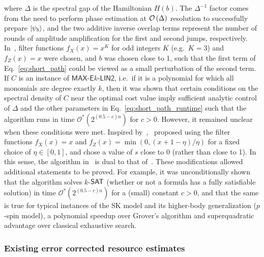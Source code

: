 \begin{refsection}
\begin{itemize}
where $\Delta$ is the spectral gap of the Hamiltonian $H(b)$. The $\Delta^{-1}$ factor comes from the need to perform phase estimation at $\mathcal{O}\left( \Delta \right)$ resolution to successfully prepare $\lvert\psi_b\rangle$, and the two additive inverse overlap terms represent the number of rounds of amplitude amplification for the first and second jumps, respectively. In~\cite{hastings2018ShortPathQuantum}, filter functions $f_X(x) = x^K$ for odd integers $K$ (e.g.~$K=3$) and $f_Z(x) = x$ were chosen, and $b$ was chosen close to 1, such that the first term of Eq.~\eqref{eq:short_path} could be viewed as a small perturbation of the second term. If $C$ is an instance of $\mathsf{MAX}$-$\mathsf{E}k$-$\mathsf{LIN2}$, i.e.~if it is a polynomial for which all monomials are degree exactly $k$, then it was shown that certain conditions on the spectral density of $C$ near the optimal cost value imply sufficient analytic control of $\Delta$ and the other parameters in Eq.~\eqref{eq:short_path_runtime} such that the algorithm runs in time $\mathcal{O}^*(2^{(0.5-c)n})$ for $c  > 0$. However, it remained unclear when these conditions were met. Inspired by~\cite{hastings2018ShortPathQuantum},~\cite{dalzell2022mindthegap} proposed using the filter functions $f_X(x) = x$ and $f_Z(x) = \min(0,(x+1-\eta)/\eta)$ for a fixed choice of $\eta \in [0,1]$, and chose a value of $s$ close to 0 (rather than close to 1). In this sense, the algorithm in~\cite{dalzell2022mindthegap} is dual to that of~\cite{hastings2018ShortPathQuantum}. These modifications allowed additional statements to be proved. For example, it was unconditionally shown that the algorithm solves $k$-$\mathsf{SAT}$ (whether or not a formula has a fully satisfiable solution) in time $\mathcal{O}^*(2^{(0.5-c)n})$ for a (small) constant $c > 0$, and that the same is true for typical instances of the SK model and its higher-body generalization ($p$-spin model), a polynomial speedup over Grover's algorithm and superquadratic advantage over classical exhaustive search. 
\end{itemize}



\subsubsection*{Existing error corrected resource estimates}


\end{refsection}
